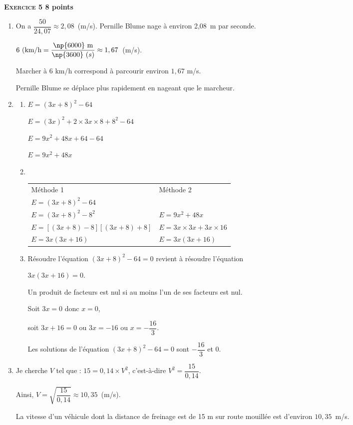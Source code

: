 \textbf{\textsc{Exercice 5} \hfill 8 points}

\medskip

\begin{enumerate}
\item On a $\dfrac{50}{24,07} \approx  2,08$~(m/s). Pernille Blume nage à environ 2,08~m par seconde.

$6~(\text{km/h} = \dfrac{\np{6000}~\text{m}}{\np{3600}~(s)} \approx  1,67$~(m/s).

Marcher à 6 km/h correspond à parcourir environ $1,67$ m/s.

Pernille Blume se déplace plus rapidement en nageant que le marcheur.
\item 
	\begin{enumerate}
		\item $E = (3x + 8)^2 - 64$
		
$E = (3x)^2 + 2 \times 3x \times 8 + 8^2 - 64$
		
$E = 9x^2 + 48x + 64 - 64$
		
$E = 9x^2 + 48x$
		\item ~
		
\begin{tabularx}{\linewidth}{X X}
Méthode 1 &Méthode 2\\
$E = (3x + 8)^2 - 64$				&\\
$E = (3x + 8)^2 - 8^2$				&$E = 9x^2 + 48x$\\
$E = [(3x + 8) - 8][ (3x + 8) + 8]$	&$E = 3x \times 3x + 3x \times 16$\\
$E = 3x(3x + 16)$					&$E = 3x(3x + 16)$\\
\end{tabularx}
		\item Résoudre l'équation $(3x + 8)^2 - 64 = 0$ revient à résoudre l'équation
		
$3x(3x + 16) = 0$.

Un produit de facteurs est nul si au moins l'un de ses facteurs est nul.

Soit $3x = 0$ donc $x = 0$, 

soit $3x+16 = 0$ ou $3x = -16$ ou $x = - \dfrac{16}{3}$.

Les solutions de l'équation $(3x + 8)^2 - 64 = 0$ sont $- \dfrac{16}{3}$ et $0$.
	\end{enumerate}
\item  Je cherche $V$ tel que : $15 = 0,14 \times  V^2$, c'est-à-dire $V^2 = \dfrac{15}{0,14}$.

Ainsi, $V = \sqrt{\dfrac{15}{0,14}} \approx 10,35$~(m/s).

La vitesse d'un véhicule dont la distance de freinage est de 15 m sur route
mouillée est d'environ $10,35$~m/s.

\end{enumerate}

\bigskip

